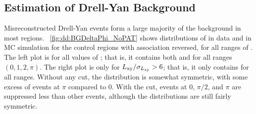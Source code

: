\subsection{Estimation of Drell-Yan Background}
\label{sec:dd:bgest-DY}
Misreconstructed Drell-Yan events form a large majority of the background in most regions.
\Fig~\ref{fig:dd:BGDeltaPhi_NoPAT} shows distributions of \DeltaPhi in data and in MC simulation for the control regions with \DSAToPAT association reversed, for all ranges of \DeltaPhi.
The left plot is for all values of \LxySig; that is, it contains both  and  for all \DeltaPhi ranges $(0, 1, 2, \pi)$.
The right plot is only for $L_{\mathrm{xy}}/\sigma_{L_{\mathrm{xy}}} > 6$; that is, it only contains  for all \DeltaPhi ranges.
Without any \LxySig cut, the distribution is somewhat symmetric, with some excess of events at $\pi$ compared to 0.
With the \LxySig cut, events at 0, $\pi/2$, and $\pi$ are suppressed less than other events, although the distributions are still fairly symmetric.

